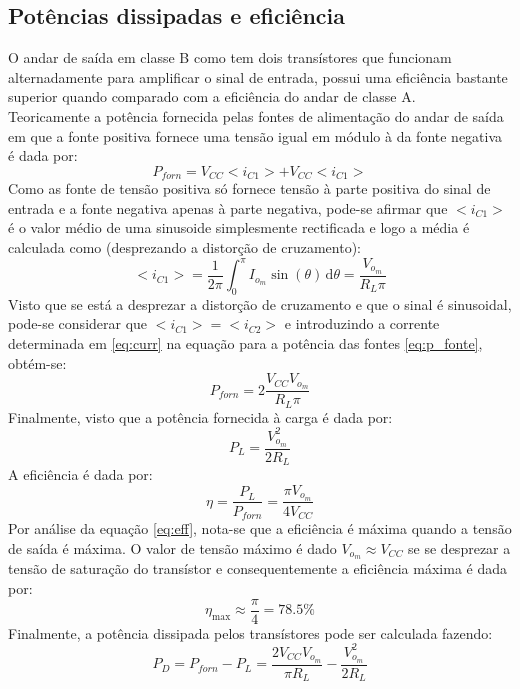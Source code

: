 \documentclass[%
  reprint,
  nofootinbib,
  amsmath,amssymb,
  aps,
  10pt,
  a4paper
]{revtex4-1}
\begin{document}
\subsection{Potências dissipadas e eficiência}
O andar de saída em classe B como tem dois transístores que funcionam alternadamente para amplificar o sinal de entrada, possui uma eficiência bastante superior quando comparado com a eficiência do andar de classe A.\\
Teoricamente a potência fornecida pelas fontes de alimentação do andar de saída em que a fonte positiva fornece uma tensão igual em módulo à da fonte negativa é dada por:
\begin{equation}
P_{forn}=V_{CC}<i_{C1}>+V_{CC}<i_{C1}>
\label{eq:p_fonte}
\end{equation}
Como as fonte de tensão positiva só fornece tensão à parte positiva do sinal de entrada e a fonte negativa apenas à parte negativa, pode-se afirmar que $<i_{C1}>$ é o valor médio de uma sinusoide simplesmente rectificada e logo a média é calculada como (desprezando a distorção de cruzamento):
\begin{equation}
<i_{C1}>=\frac{1}{2\pi}\int_0^{\pi} \! I_{o_m}\sin(\theta) \, \mathrm{d}\theta=\frac{V_{o_m}}{R_L\pi}
\label{eq:curr}
\end{equation}
Visto que se está a desprezar a distorção de cruzamento e que o sinal é sinusoidal, pode-se considerar que $<i_{C1}>=<i_{C2}>$ e introduzindo a corrente determinada em \ref{eq:curr} na equação para a potência das fontes \ref{eq:p_fonte}, obtém-se:
\begin{equation}
P_{forn}=2\frac{V_{CC}V_{o_m}}{R_L\pi}
\label{eq:p_fonte_f}
\end{equation}
Finalmente, visto que a potência fornecida à carga é dada por:
\begin{equation}
P_L=\frac{V_{o_m}^2}{2R_L}
\end{equation}
A eficiência é dada por:
\begin{equation}
\eta=\frac{P_L}{P_{forn}}=\frac{\pi V_{o_m}}{4V_{CC}}
\label{eq:eff}
\end{equation}
Por análise da equação \ref{eq:eff}, nota-se que a eficiência é máxima quando a tensão de saída é máxima. O valor de tensão máximo é dado $V_{o_m}\approx V_{CC}$ se se desprezar a tensão de saturação do transístor e consequentemente a eficiência máxima é dada por:
\begin{equation}
\eta_{\mathrm{max}}\approx \frac{\pi}{4}=78.5\%
\end{equation}
Finalmente, a potência dissipada pelos transístores pode ser calculada fazendo:
\begin{equation}
P_D=P_{forn}-P_L=\frac{2V_{CC}V_{o_m}}{\pi R_L}-\frac{V_{o_m}^2}{2R_L}
\label{eq:p_diss}
\end{equation}
\end{document}
